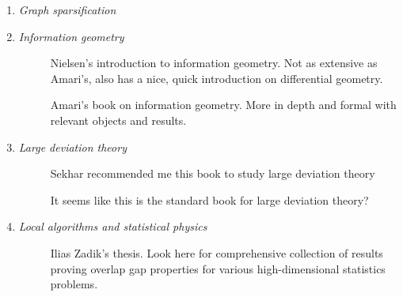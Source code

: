 \documentclass{article}
\theoremstyle{definition}
\begin{document}
\begin{enumerate}[--]

%


\item \emph{Graph sparsification}
%


\item \emph{Information geometry}
\begin{description}
\item[\cite{Nie18}] Nielsen's introduction to information geometry. Not as extensive as Amari's, also has a nice, quick introduction on differential geometry.

\item[\cite{Ama16}] Amari's book on information geometry. More in depth and formal with relevant objects and results.
\end{description}


\item \emph{Large deviation theory}
\begin{description}
\item[\cite{DZ11}] Sekhar recommended me this book to study large deviation theory

\item[\cite{Var84}] It seems like this is the standard book for large deviation theory?
\end{description}


\item \emph{Local algorithms and statistical physics}
\begin{description}
\item[\cite{Zad19}] Ilias Zadik's thesis. Look here for comprehensive collection of results proving overlap gap properties for various high-dimensional statistics problems.
\end{description}


\end{enumerate}
\end{document}

